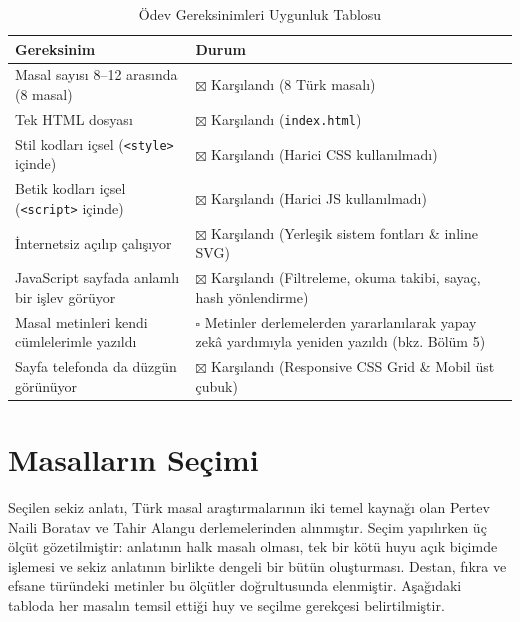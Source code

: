 \documentclass[11pt,a4paper]{article}
\begin{document}
\begin{table}[h!]
\centering
\begin{tabularx}{\textwidth}{lX}
\toprule
\textbf{Gereksinim} & \textbf{Durum} \\
\midrule
Masal sayısı 8--12 arasında (8 masal) & $\boxtimes$ Karşılandı (8 Türk masalı) \\
Tek HTML dosyası & $\boxtimes$ Karşılandı (\texttt{index.html}) \\
Stil kodları içsel (\texttt{<style>} içinde) & $\boxtimes$ Karşılandı (Harici CSS kullanılmadı) \\
Betik kodları içsel (\texttt{<script>} içinde) & $\boxtimes$ Karşılandı (Harici JS kullanılmadı) \\
İnternetsiz açılıp çalışıyor & $\boxtimes$ Karşılandı (Yerleşik sistem fontları \& inline SVG) \\
JavaScript sayfada anlamlı bir işlev görüyor & $\boxtimes$ Karşılandı (Filtreleme, okuma takibi, sayaç, hash yönlendirme) \\
Masal metinleri kendi cümlelerimle yazıldı & $\square$ Metinler derlemelerden yararlanılarak yapay zekâ yardımıyla yeniden yazıldı (bkz. Bölüm 5) \\
Sayfa telefonda da düzgün görünüyor & $\boxtimes$ Karşılandı (Responsive CSS Grid \& Mobil üst çubuk) \\
\bottomrule
\end{tabularx}
\caption{Ödev Gereksinimleri Uygunluk Tablosu}
\end{table}

\section{Masalların Seçimi}

Seçilen sekiz anlatı, Türk masal araştırmalarının iki temel kaynağı olan Pertev Naili Boratav ve Tahir Alangu derlemelerinden alınmıştır. Seçim yapılırken üç ölçüt gözetilmiştir: anlatının halk masalı olması, tek bir kötü huyu açık biçimde işlemesi ve sekiz anlatının birlikte dengeli bir bütün oluşturması. Destan, fıkra ve efsane türündeki metinler bu ölçütler doğrultusunda elenmiştir. Aşağıdaki tabloda her masalın temsil ettiği huy ve seçilme gerekçesi belirtilmiştir.
\end{document}
